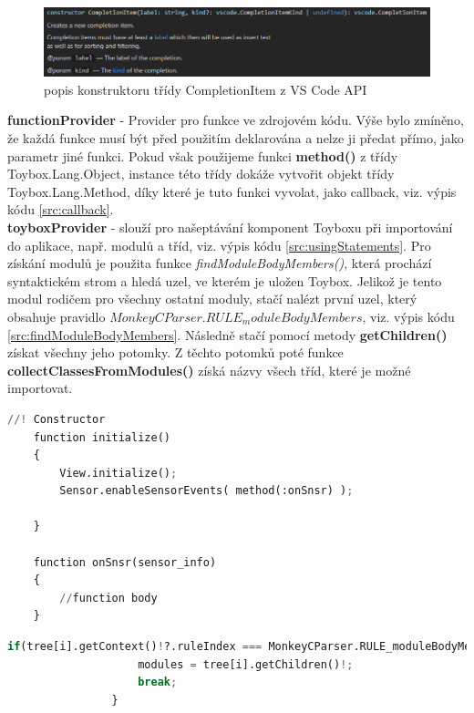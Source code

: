 \begin{figure}
	\centering
	\includegraphics[width=\textwidth,scale=1]{images/CompletionItem}
	\caption{popis konstruktoru třídy CompletionItem z VS Code API}
	\label{img:CompletionItem}
\end{figure}

\textbf{functionProvider} - Provider pro funkce ve zdrojovém kódu. Výše bylo zmíněno, že každá funkce musí být před použitím deklarována a nelze ji předat přímo, jako parametr jiné funkci. Pokud však použijeme funkci \textbf{method()} z třídy Toybox.Lang.Object, instance této třídy dokáže vytvořit objekt třídy Toybox.Lang.Method, díky které je tuto funkci vyvolat, jako callback, viz. výpis kódu \ref{src:callback}.\\

\textbf{toyboxProvider} - slouží pro našeptávání komponent Toyboxu při importování do aplikace, např. modulů a tříd, viz. výpis kódu \ref{src:usingStatements}. Pro získání modulů je použita funkce \textit{findModuleBodyMembers()}, která prochází syntaktickém strom a hledá uzel, ve kterém je uložen Toybox. Jelikož je tento modul rodičem pro všechny ostatní moduly, stačí nalézt první uzel, který obsahuje pravidlo \textit{$MonkeyCParser.RULE_moduleBodyMembers$}, viz. výpis kódu \ref{src:findModuleBodyMembers}. Následně stačí pomocí metody \textbf{getChildren()} získat všechny jeho potomky. Z těchto potomků poté funkce \textbf{collectClassesFromModules()} získá názvy všech tříd, které je možné importovat.\\

\begin{lstlisting}[language=Python,label=src:callback,caption={ukázka použití funkce, jako callback}]
    //! Constructor
    function initialize()
    {
        View.initialize();
        Sensor.enableSensorEvents( method(:onSnsr) );

    }

    function onSnsr(sensor_info)
    {
        //function body
    }
\end{lstlisting}

\begin{lstlisting}[language=Python,label=src:findModuleBodyMembers,caption={funkce prochází strom a hledá uzel, ve kterém je uložen Toybox}]
                    if(tree[i].getContext()!?.ruleIndex === MonkeyCParser.RULE_moduleBodyMembers) {
                    modules = tree[i].getChildren()!;
                    break;
                }
\end{lstlisting}


